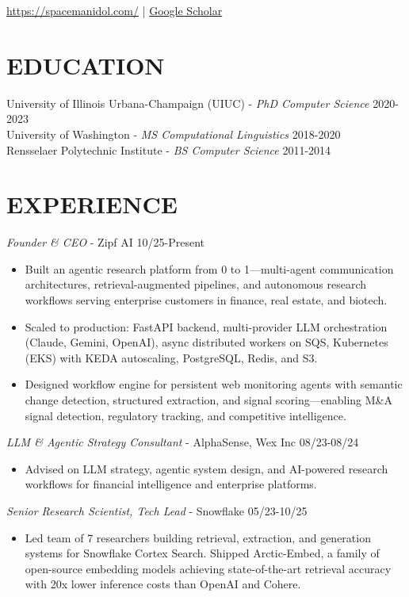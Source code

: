 \documentclass[line,margin]{res}
\begin{document}
\address{\href{mailto:daniel.campos@zipf.ai}{daniel.campos@zipf.ai}}
\href{https://spacemanidol.com/}{https://spacemanidol.com/} | \href{https://scholar.google.com/citations?user=nlHptm8AAAAJ&hl=en}{Google Scholar}
\begin{resume}
\section{EDUCATION}
University of Illinois Urbana-Champaign (UIUC) - {\sl PhD Computer Science} 2020-2023 \\
University of Washington - {\sl MS Computational Linguistics} 2018-2020 \\
Rensselaer Polytechnic Institute - {\sl BS Computer Science} 2011-2014
\section{EXPERIENCE}
{\sl Founder \& CEO} - Zipf AI \hfill 10/25-Present
\begin{itemize} \itemsep -4pt
\item Built an agentic research platform from 0 to 1---multi-agent communication architectures, retrieval-augmented pipelines, and autonomous research workflows serving enterprise customers in finance, real estate, and biotech.
\item Scaled to production: FastAPI backend, multi-provider LLM orchestration (Claude, Gemini, OpenAI), async distributed workers on SQS, Kubernetes (EKS) with KEDA autoscaling, PostgreSQL, Redis, and S3.
\item Designed workflow engine for persistent web monitoring agents with semantic change detection, structured extraction, and signal scoring---enabling M\&A signal detection, regulatory tracking, and competitive intelligence.
\end{itemize}
{\sl LLM \& Agentic Strategy Consultant} - AlphaSense, Wex Inc \hfill 08/23-08/24
\begin{itemize} \itemsep -4pt
\item Advised on LLM strategy, agentic system design, and AI-powered research workflows for financial intelligence and enterprise platforms.
\end{itemize}
{\sl Senior Research Scientist, Tech Lead} - Snowflake \hfill 05/23-10/25
\begin{itemize} \itemsep -4pt
\item Led team of 7 researchers building retrieval, extraction, and generation systems for Snowflake Cortex Search. Shipped Arctic-Embed, a family of open-source embedding models achieving state-of-the-art retrieval accuracy with 20x lower inference costs than OpenAI and Cohere.

\end{itemize}
\end{resume}
\end{document}
